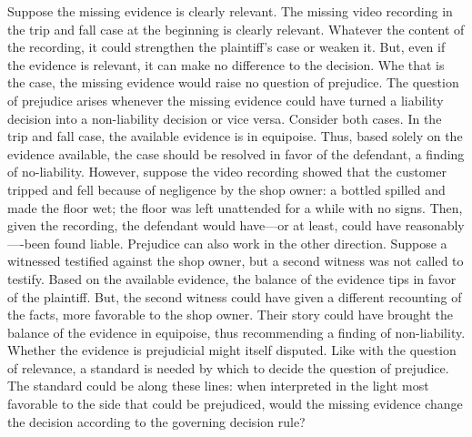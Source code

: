 \documentclass[
  10pt,
  dvipsnames,enabledeprecatedfontcommands]{scrartcl}
\begin{document}
Suppose the missing evidence is clearly relevant. The missing video
recording in the trip and fall case at the beginning is clearly
relevant. Whatever the content of the recording, it could strengthen the
plaintiff's case or weaken it. But, even if the evidence is relevant, it
can make no difference to the decision. Whe that is the case, the
missing evidence would raise no question of prejudice. The question of
prejudice arises whenever the missing evidence could have turned a
liability decision into a non-liability decision or vice versa. Consider
both cases. In the trip and fall case, the available evidence is in
equipoise. Thus, based solely on the evidence available, the case should
be resolved in favor of the defendant, a finding of no-liability.
However, suppose the video recording showed that the customer tripped
and fell because of negligence by the shop owner: a bottled spilled and
made the floor wet; the floor was left unattended for a while with no
signs. Then, given the recording, the defendant would have---or at
least, could have reasonably----been found liable. Prejudice can also
work in the other direction. Suppose a witnessed testified against the
shop owner, but a second witness was not called to testify. Based on the
available evidence, the balance of the evidence tips in favor of the
plaintiff. But, the second witness could have given a different
recounting of the facts, more favorable to the shop owner. Their story
could have brought the balance of the evidence in equipoise, thus
recommending a finding of non-liability. Whether the evidence is
prejudicial might itself disputed. Like with the question of relevance,
a standard is needed by which to decide the question of prejudice. The
standard could be along these lines: when interpreted in the light most
favorable to the side that could be prejudiced, would the missing
evidence change the decision according to the governing decision rule?
\end{document}
